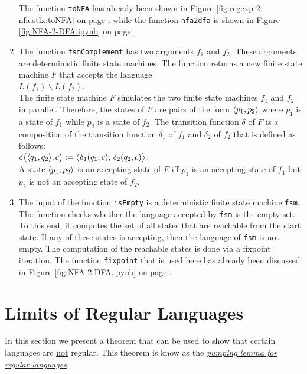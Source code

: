 \begin{enumerate}
      The function \texttt{toNFA} has already been shown in
      Figure \ref{fig:regexp-2-nfa.stlx:toNFA} on page
      \pageref{fig:regexp-2-nfa.stlx:toNFA}, while the function \texttt{nfa2dfa}
      is shown in Figure \ref{fig:NFA-2-DFA.ipynb} on page \pageref{fig:NFA-2-DFA.ipynb}.
\item The function \texttt{fsmComplement} has two arguments $f_1$ and $f_2$.  These
      arguments are deterministic finite state machines.  The function returns a new
      finite state machine $F$ that accepts the language
      \\[0.2cm]
      \hspace*{1.3cm}
      $L(f_1) \backslash L(f_2)$.
      \\[0.2cm]
      The finite state machine $F$ simulates the two finite state machines $f_1$ and $f_2$
      in parallel.  Therefore, the states of $F$ are pairs of the form $\pair(p_1, p_2)$
      where $p_1$ is a state of $f_1$ while $p_2$ is a state of $f_2$.  The transition
      function $\delta$ of $F$ is a composition of the transition function $\delta_1$ of
      $f_1$  and $\delta_2$ of $f_2$ that is defined as follows:
      \\[0.2cm]
      \hspace*{1.3cm}
      $\delta\bigr(\pair(q_1, q_2), c\bigr) := \bigl\langle \delta_1(q_1,c),\, \delta_2(q_2,c)\bigr\rangle$.
      \\[0.2cm]
      A state $\pair(p_1, p_2)$ is an accepting state of $F$ iff $p_1$ is an accepting state of $f_1$ but
      $p_2$ is not an accepting state of $f_2$.
\item The input of the function \texttt{isEmpty} is a deterministic finite state machine
      \texttt{fsm}.  The function checks whether the language accepted by \texttt{fsm} is
      the empty set.  To this end, it computes the set of all states that are reachable
      from the start state.  If any of these states is accepting, then the language
      of \texttt{fsm} is not empty.  The computation of the reachable states is done via a fixpoint
      iteration.  The function \texttt{fixpoint} that is used here has already been discussed in
      Figure \ref{fig:NFA-2-DFA.ipynb} on page \pageref{fig:NFA-2-DFA.ipynb}.
\end{enumerate}

\section{Limits of Regular Languages}
In this section we present a theorem that can be used to show that certain languages are
\underline{not} regular.  This theorem is know as the 
\href{https://en.wikipedia.org/wiki/Pumping_lemma_for_regular_languages}{\emph{pumping lemma for regular languages}}.

